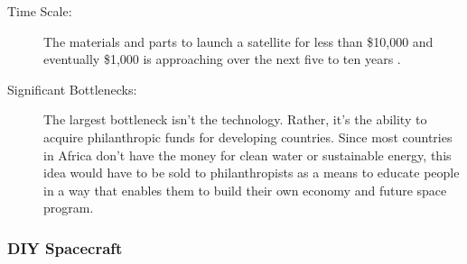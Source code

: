 \begin{description}
\item[Time Scale:] The materials and parts to launch a satellite for less than \$10,000 and eventually \$1,000 is approaching over the next five to ten years \cite{Patel2010}.

\item[Significant Bottlenecks:]
The largest bottleneck isn't the technology. Rather, it's the ability to acquire philanthropic funds for developing countries. Since most countries in Africa don't have the money for clean water or sustainable energy, this idea would have to be sold to philanthropists as a means to educate people in a way that enables them to build their own economy and future space program.
\end{description}

\subsubsection{DIY Spacecraft}

